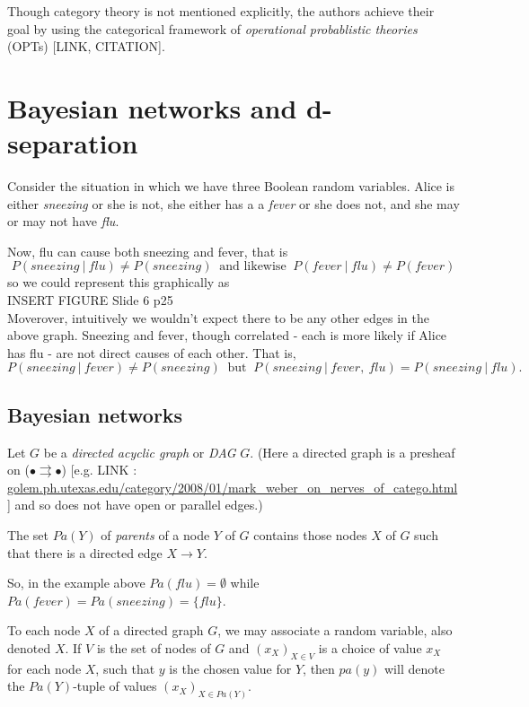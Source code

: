 \documentclass[11pt, oneside]{article}   	%
\begin{document}
Though category theory is not mentioned explicitly, the authors achieve their goal by using the categorical framework of \emph{operational probablistic theories} (OPTs) [LINK, CITATION].


\section{Bayesian networks and d-separation}



Consider the situation in which we have three Boolean random variables. Alice is either \emph{sneezing} or she is not, she either has a  a \emph{fever} or she does not, and she may or may not have \emph{flu}.

Now, flu can cause both sneezing and fever, that is
\[ P(sneezing \ | \ flu ) \neq P( sneezing) \  \text{ and likewise } \ P(fever \ | \ flu ) \neq P( fever) \]
so we could represent this graphically as
\\
INSERT FIGURE Slide 6 p25
\\
Moverover, intuitively we wouldn't expect there to be any other edges in the above graph. Sneezing and fever, though correlated - each is more likely if Alice has flu - are not direct causes of each other.  That is,
\[ P(sneezing \ | \ fever ) \neq P(sneezing) \  \text{ but } \ P(sneezing \ | \ fever, \ flu ) = P(sneezing \ | \ flu).\]




\subsection{Bayesian networks}
Let $G$ be a \emph{directed acyclic graph} or \emph{DAG} $G$. (Here a directed graph is a presheaf on ($ \bullet \rightrightarrows \bullet$) [e.g. LINK : \href{https://golem.ph.utexas.edu/category/2008/01/mark_weber_on_nerves_of_catego.html}{golem.ph.utexas.edu/category/2008/01/mark\_weber\_on\_nerves\_of\_catego.html}] and so does not have open or parallel edges.)

The set $Pa(Y)$ of \emph{parents} of a node $Y$ of $G$ contains those nodes $X$ of $G$ such that there is a directed edge $X \to Y$.

So, in the example above $Pa(flu) = \emptyset$ while $Pa(fever) = Pa(sneezing) = \{ flu \}$.


To each node $X$ of a directed graph $G$, we may associate a random variable, also denoted $X$. If $V$ is the set of nodes of $G$ and $(x_X)_{X \in V}$ is a choice of value $x_X$ for each node $X$, such that $y$ is the chosen value for $Y$, then $pa(y)$ will denote the $Pa(Y)$-tuple of values $(x_X)_{X \in Pa(Y)}$. 
\end{document}
